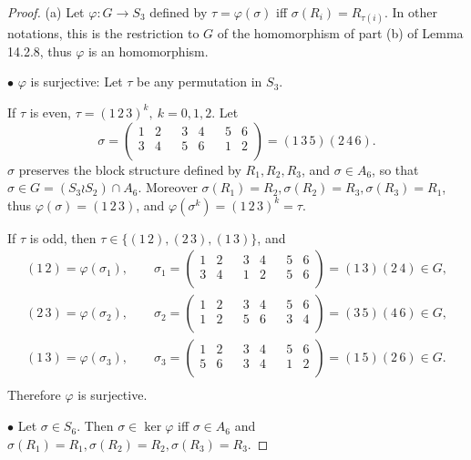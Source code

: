 \documentclass[11pt,a4paper]{article}
\begin{document}
\begin{proof}
\item[(a)] Let $\varphi : G \to S_3$ defined by $\tau = \varphi(\sigma)$ iff $\sigma(R_i) = R_{\tau(i)}$. In other notations, this is the restriction to $G$ of the homomorphism of part (b) of Lemma 14.2.8, thus $\varphi$ is an homomorphism.

$\bullet$ $\varphi$ is surjective: Let $\tau$ be any permutation in $S_3$. 

If $\tau$ is even, $\tau = (1\,2\,3)^k,\ k = 0,1,2$. Let
$$\sigma =
\left(
\begin{array}{cccccccc}
1 & 2 & & 3 & 4 & & 5 & 6\\
3 & 4 & & 5 & 6 & & 1& 2\\
\end{array}
\right)
= (1\,3\,5)(2\,4\,6).
$$
$\sigma$ preserves the block structure defined by $R_1,R_2,R_3$, and $\sigma \in A_6$, so that $\sigma \in G = (S_3 \wr S_2) \cap A_6$. Moreover $\sigma(R_1) = R_2, \sigma(R_2) = R_3, \sigma(R_3) = R_1$, thus $\varphi(\sigma) = (1\,2\,3)$, and $\varphi(\sigma^k )= (1\,2\,3)^k = \tau$.

If $\tau$ is odd, then $\tau \in \{(1\,2),(2\,3),(1\,3)\}$, and
\begin{align*}
(1\,2) = \varphi(\sigma_1), \qquad \sigma_1 = 
\left(
\begin{array}{cccccccc}
1 & 2 & & 3 & 4 & & 5 & 6\\
3 & 4 & & 1 & 2 & & 5& 6\\
\end{array}
\right) = (1\,3)(2\,4) \in G,\\
(2\,3) = \varphi(\sigma_2), \qquad \sigma_2 = 
\left(
\begin{array}{cccccccc}
1 & 2 & & 3 & 4 & & 5 & 6\\
1 & 2 & & 5 & 6 & & 3& 4\\
\end{array}
\right) = (3\,5)(4\,6) \in G,\\
(1\,3) = \varphi(\sigma_3), \qquad \sigma_3 = 
\left(
\begin{array}{cccccccc}
1 & 2 & & 3 & 4 & & 5 & 6\\
5 & 6 & & 3 & 4 & & 1& 2\\
\end{array}
\right) = (1\,5)(2\,6) \in G.\\
\end{align*}
Therefore $\varphi$ is surjective.

$\bullet$ Let $\sigma \in S_6$. Then $\sigma \in \ker \varphi$ iff $\sigma \in A_6$ and $\sigma(R_1) = R_1, \sigma(R_2) = R_2, \sigma(R_3) = R_3$.


\end{proof}
\end{document}
